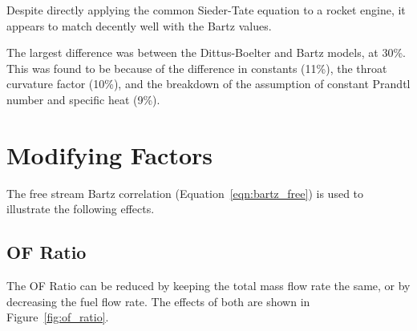 \documentclass[11pt]{article}
\begin{document}
Despite directly applying the common Sieder-Tate equation to a rocket engine, it appears to match decently well with the Bartz values.

The largest difference was between the Dittus-Boelter and Bartz models, at 30\%. This was found to be because of the difference in constants (11\%), the throat curvature factor (10\%), and the breakdown of the assumption of constant Prandtl number and specific heat (9\%).

\section{Modifying Factors}

The free stream Bartz correlation (Equation~\ref{eqn:bartz_free}) is used to illustrate the following effects.

\subsection{OF Ratio}

The OF Ratio can be reduced by keeping the total mass flow rate the same, or by decreasing the fuel flow rate. The effects of both are shown in Figure~\ref{fig:of_ratio}.
\end{document}
